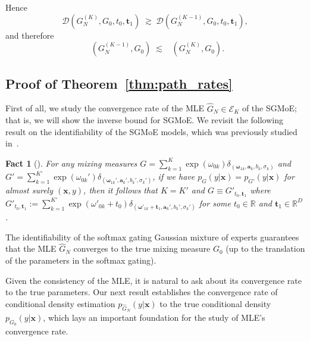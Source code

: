 \documentclass[twoside]{article}
\DeclareMathOperator*{\VDFRA}{D_{FRA}}
\theoremstyle{plain}
\newtheorem{fact}{Fact}
\theoremstyle{definition}
\theoremstyle{plain}
\def\vomega{{\bm{\omega}}}
\def\va{{\bm{a}}}
\def\vt{{\bm{t}}}
\def\vx{{\bm{x}}}
\newcommand{\cD}{\mathcal{D}}
\newcommand{\cE}{\mathcal{E}}
\begin{document}
Hence
\[
\cD(G_N^{(K)},G_0, t_0, \vt_1)\;\gtrsim\;\cD(G_N^{(K-1)},G_0, t_0, \vt_1),
\]
and therefore
\[
\VDFRA(G_N^{(K-1)},G_0)\;\lesssim\;\VDFRA(G_N^{(K)},G_0).
\]




\subsection{Proof of Theorem~\ref{thm:path_rates}}\label{sec:proof_of_thm1}

First of all, we study the convergence rate of the MLE $\widehat{G}_N \in \cE_K$ of the SGMoE; that is, we will show the inverse bound for SGMoE. We revisit the following result on the identifiability of the SGMoE models, which was previously studied in~\cite{nguyen_demystifying_2023,jiang_identifiability_1999}.

\begin{fact}[{\citealp[Proposition 1]{nguyen_demystifying_2023}}]
\label{prop_identify}
For any mixing measures $G = \sum_{k = 1}^{K} \exp(\omega_{0k}) \delta_{(\vomega_{1k}, \va_{k}, b_{k}, \sigma_{k})}$ and $G' = \sum_{k = 1}^{K'} \exp(\omega_{0k}') \delta_{(\vomega_{1k}', \va_{k}', b_{k}', \sigma_{k}')}$, if we have $p_{G}(y| \vx) = p_{G'}(y| \vx)$ for almost surely $(\vx, y)$, then it follows that $K = K'$ and $G \equiv G'_{t_{0},\vt_1}$ where $G'_{t_{0},\vt_1}:=\sum_{k=1}^{K'}\exp(\omega'_{0k}+t_{0})\delta_{(\vomega'_{1k}+\vt_1,\va_{k}', b_{k}',\sigma_{k}')}$ for some $t_{0}\in\mathbb{R}$ and $\vt_1\in\mathbb{R}^D$.

\end{fact}
The identifiability of the softmax gating Gaussian mixture of experts guarantees that the MLE $\widehat{G}_{N}$ converges to the true mixing measure $G_{0}$ (up to the translation of the parameters in the softmax gating).  

Given the consistency of the MLE, it is natural to ask about its convergence rate to the true parameters. Our next result establishes the convergence rate of conditional density estimation $p_{\widehat{G}_{N}}(y| \vx)$ to the true conditional density $p_{G_{0}}(y| \vx)$, which lays an important foundation for the study of MLE's convergence rate.
\end{document}
